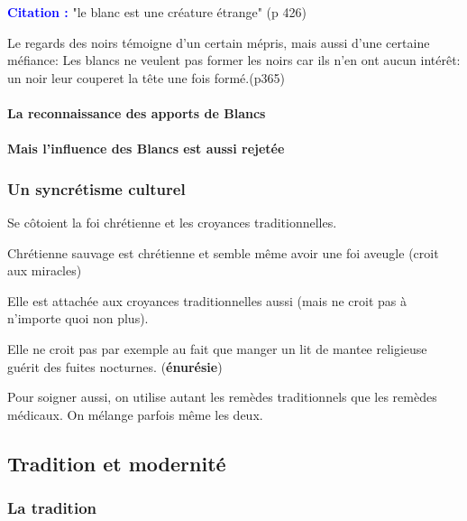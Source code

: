 \documentclass[a4paper, 11pt, hidelinks]{article}
\newcommand{\bs}{\bigskip}
\newcommand{\cit}{\large \textcolor{blue}{\textbf{Citation :}} \large }
\begin{document}
\cit "le blanc est une créature étrange" (p 426)

\bs


Le regards des noirs témoigne d'un certain mépris, mais aussi d'une certaine méfiance:
Les blancs ne veulent pas former les noirs car ils n'en ont aucun intérêt: un noir leur couperet la tête
une fois formé.(p365)





\paragraph{La reconnaissance des apports de Blancs}








\paragraph{Mais l'influence des Blancs est aussi rejetée}





\subsubsection{Un syncrétisme culturel}



Se côtoient la foi chrétienne et les croyances traditionnelles.

\bs

Chrétienne sauvage est chrétienne et semble même avoir une foi aveugle (croit aux miracles)

Elle est attachée aux croyances traditionnelles aussi (mais ne croit pas à n'importe quoi non plus).

Elle ne croit pas par exemple au fait que manger un lit de mantee religieuse guérit des fuites nocturnes. (\textbf{énurésie})
\bs


Pour soigner aussi, on utilise autant les remèdes traditionnels que les remèdes médicaux.
On mélange parfois même les deux.



\subsection{Tradition et modernité}


\subsubsection{La tradition}
\end{document}

